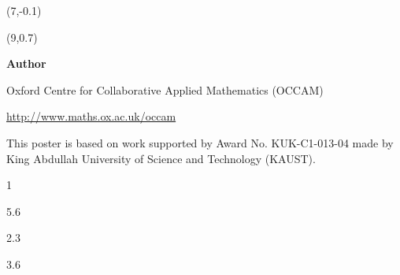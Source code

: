 \documentclass[a0]{a0poster}
\begin{document}
{
%
\logos

\selectfont
\begin{textblock}{20}(7,-0.1)
\end{textblock}

%

\begin{textblock}{16}(9,0.7)
\begin{center}
{\bfseries\Large Author}

Oxford Centre for Collaborative Applied Mathematics (OCCAM)

\url{http://www.maths.ox.ac.uk/occam}

\smallskip

This poster is based on work supported by Award No. KUK-C1-013-04 made by\\
King Abdullah University of Science and Technology (KAUST).
\end{center}
\end{textblock}
}


\sffamily


\framethick
\begin{area1w}{1}

\ccc

\ccc

\ccc

\end{area1w}

\TPMargin{20pt}

\frameoff
\begin{area1}{5.6}

\ccc


\ccc
 
\end{area1}


\begin{area2}{2.3}

\ccc

\end{area2}

\framethin
\begin{area2}{3.6}

\ccc

\end{area2}
\end{document}
